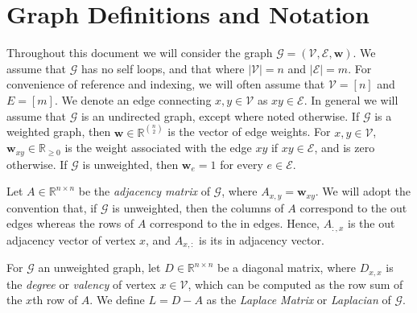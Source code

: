 \documentclass{report}
\begin{document}
\section{Graph Definitions and Notation} \label{background:sec:graphdef}

Throughout this document we will consider the graph $\mathcal{G} = (\mathcal{V}, \mathcal{E}, \mathbf{w})$.
We assume that $\mathcal{G}$ has no self loops, and that where $|\mathcal{V}| = n$ and $|\mathcal{E}| = m$.
For convenience of reference and indexing, we will often assume that $\mathcal{V} = [n]$ and $E = [m]$. 
We denote an edge connecting $x, y \in \mathcal{V}$ as $xy \in \mathcal{E}$. 
In general we will assume that $\mathcal{G}$ is an  undirected graph, except where noted otherwise. 
If $\mathcal{G}$ is a weighted graph, then $\mathbf{w} \in \mathbb{R}^{{n \choose 2}}$ is the vector of edge weights. 
For $x, y \in \mathcal{V}$, $\mathbf{w}_{xy} \in \mathbb{R}_{\geq 0}$ is the weight associated with the edge $xy$ if $xy \in \mathcal{E}$, and is zero otherwise.
If $\mathcal{G}$ is unweighted, then $\mathbf{w}_e = 1$ for every $e \in \mathcal{E}$. 

Let $A \in \mathbb{R}^{n\times n}$ be the \emph{adjacency matrix} of $\mathcal{G}$, where $A_{x,y} = \mathbf{w}_{xy}$.
We will adopt the convention that, if $\mathcal{G}$ is unweighted, then the columns of $A$ correspond to the out edges whereas the rows of $A$ correspond to the in edges. 
Hence, $A_{:,x}$ is the out adjacency vector of vertex $x$, and $A_{x,:}$ is its in adjacency vector.

For $\mathcal{G}$ an unweighted graph, let $D \in \mathbb{R}^{n\times n}$ be a diagonal matrix, where $D_{x,x}$ is the \emph{degree} or \emph{valency} of vertex $x \in \mathcal{V}$, which can be computed as the row sum of the $x$th row of $A$. 
We define $L = D - A$ as the \emph{Laplace Matrix} or \emph{Laplacian} of $\mathcal{G}$.
\end{document}
